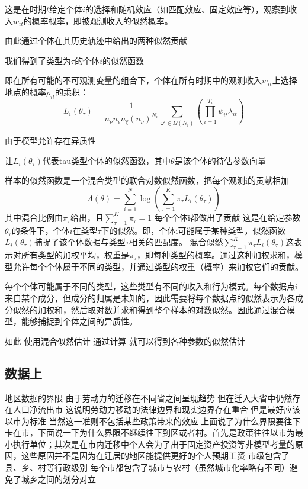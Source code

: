\documentclass[a4paper,12pt]{article}
\begin{document}
这是在时期$t$给定个体$i$的选择和随机效应（如匹配效应、固定效应等），观察到收入$w_{it}$的概率概率，即被观测收入的似然概率。

由此通过个体在其历史轨迹中给出的两种似然贡献

我们得到了类型为$\tau$的个体$i$的似然函数

即在所有可能的不可观测变量的组合下，个体在所有时期中的观测收入$w_{it}$上选择地点的概率$\rho_{it}$的乘积：
\begin{equation}
  L_{i}(\theta_{\tau})=\frac{1}{n_{\nu}n_{\epsilon}n_{\xi}(n_{\nu})^{N_{i}}} \sum\limits_{\omega^{i}\in\Omega(N_{i})}(\prod\limits_{i=1}^{T_{i}} \psi_{it}\lambda_{it})
\end{equation}

由于模型允许存在异质性

让$L_{i}(\theta_{\tau})$代表tau类型个体的似然函数，其中$\theta$是该个体的待估参数向量

样本的似然函数是一个混合类型的联合对数似然函数，把每个观测i的贡献相加
\begin{equation}
\Lambda(\theta)=\sum\limits_{i=1}^{N}\log(\sum\limits_{\tau=1}^{K}\pi_{\tau}L_{i}(\theta_{\tau})) 
\end{equation}
其中混合比例由$\pi_{\tau}$给出，且$\sum\limits_{\tau=1}^{K}\pi_{\tau}=1$
每个个体i都做出了贡献
这是在给定参数$\theta_{\tau}$的条件下，个体$i$在类型$\tau$下的似然。即，个体i可能属于某种类型，似然函数
$L_i(\theta_{\tau})$捕捉了该个体数据与类型$\tau$相关的匹配度。
混合似然$\sum_{\tau=1}^{K} \pi_{\tau} L_i(\theta_{\tau})$这表示对所有类型的加权平均，权重是$\pi_{\tau}$，即每种类型的概率。通过这种加权求和，模型允许每个个体属于不同的类型，并通过类型的权重（概率）来加权它们的贡献。

每个个体可能属于不同的类型，这些类型有不同的收入和行为模式。每个数据点i来自某个成分，但成分的归属是未知的，因此需要将每个数据点的似然表示为各成分似然的加权和，然后取对数并求和得到整个样本的对数似然。因此通过混合模型，能够捕捉到个体之间的异质性。


如此
使用混合似然估计
通过计算
就可以得到各种参数的似然估计




\subsection{数据上}

地区数据的界限
由于劳动力的迁移在不同省之间呈现趋势 但在迁入大省中仍然存在人口净流出市 这说明劳动力移动的法律边界和现实边界存在重合 但是最好应该以市为标准 当然这一准则不包括某些政策带来的效应
上面说了为什么界限要往下卡在市，下面说一下为什么界限不继续往下到区或者村。首先是政策往往以市为最小执行单位；其次是在市内迁移中个人会为了出于固定资产投资等非模型考量的原因，这些原因并不是因为在迁居的地区能提供更好的个人预期工资
市级包含了县、乡、村等行政级别 每个市都包含了城市与农村（虽然城市化率略有不同）避免了城乡之间的划分对立
\end{document}
